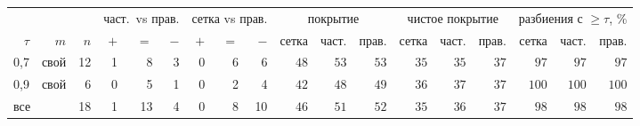 \begin{tabular}{rrr rrr rrr rrr rrr rrr}
\toprule
& & & \multicolumn{3}{c}{част.\ vs прав.} & \multicolumn{3}{c}{сетка vs прав.} & \multicolumn{3}{c}{покрытие} & \multicolumn{3}{c}{чистое покрытие} & \multicolumn{3}{c}{разбиения с $\ge\tau$, \%}\\
\cmidrule(lr){4-6}\cmidrule(lr){7-9}\cmidrule(lr){10-12}\cmidrule(lr){13-15}\cmidrule(lr){16-18}
$\tau$ & $m$ & $n$ & $+$ & $=$ & $-$ & $+$ & $=$ & $-$ & сетка & част. & прав. & сетка & част. & прав. & сетка & част. & прав.\\
\midrule
0{,}7 & свой & 12 & 1 & 8 & 3 & 0 & 6 & 6 & $48$ & $53$ & $53$ & $35$ & $35$ & $37$ & $97$ & $97$ & $97$\\
0{,}9 & свой & 6 & 0 & 5 & 1 & 0 & 2 & 4 & $42$ & $48$ & $49$ & $36$ & $37$ & $37$ & $100$ & $100$ & $100$\\
\midrule
\multicolumn{2}{l}{все} & 18 & 1 & 13 & 4 & 0 & 8 & 10 & $46$ & $51$ & $52$ & $35$ & $36$ & $37$ & $98$ & $98$ & $98$\\
\bottomrule
\end{tabular}

